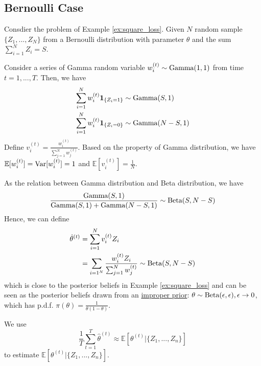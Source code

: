 \documentclass[11pt]{elegantbook}
\begin{document}
\subsection{Bernoulli Case}
Consdier the problem of Example \ref{ex:square_loss}. Given $N$ random sample $\{Z_1,...,Z_N\}$ from a Bernoulli distribution with parameter $\theta$ and the sum $\sum_{i=1}^N Z_i=S$.

Consider a series of Gamma random variable $w_i^{(t)}\sim \textnormal{Gamma}(1,1)$ from time $t=1,...,T$. Then, we have
\begin{equation}
    \begin{aligned}
        \sum_{i=1}^N w_i^{(t)} \mathbf{1}_{\{Z_i=1\}}&\sim \textnormal{Gamma}(S,1)\\
        \sum_{i=1}^N w_i^{(t)} \mathbf{1}_{\{Z_i=0\}}&\sim \textnormal{Gamma}(N-S,1)
    \end{aligned}
    \nonumber
\end{equation}
Define $v_i^{(t)}=\frac{w_i^{(t)}}{\sum_{j=1}^N w_j^{(t)}}$. Based on the property of Gamma distribution, we have $\mathbb{E}[w_i^{(t)}]=\textnormal{Var}[w_i^{(t)}]=1$ and $\mathbb{E}[v_i^{(t)}]=\frac{1}{N}$.

As the relation between Gamma distribution and Beta distribution, we have
\begin{equation}
    \begin{aligned}
        \frac{\textnormal{Gamma}(S,1)}{\textnormal{Gamma}(S,1)+\textnormal{Gamma}(N-S,1)}\sim \textnormal{Beta}(S,N-S)
    \end{aligned}
    \nonumber
\end{equation}
Hence, we can define
\begin{equation}
    \begin{aligned}
        \hat{\theta}^{(t)}&=\sum_{i=1}^N v_i^{(t)}Z_i\\
        &=\sum_{i=1^N}\frac{w_i^{(t)}Z_i}{\sum_{j=1}^N w_j^{(t)}}\sim \textnormal{Beta}(S,N-S)
    \end{aligned}
    \nonumber
\end{equation}
which is close to the posterior beliefs in Example \ref{ex:square_loss} and can be seen as the posterior beliefs drawn from an \underline{improper prior}: $\theta\sim \textnormal{Beta}(\epsilon,\epsilon), \epsilon \rightarrow 0$, which has p.d.f. $\pi(\theta)=\frac{1}{\theta(1-\theta)}$.

We use $$\frac{1}{T}\sum_{t=1}^T\hat{\theta}^{(t)}\approx \mathbb{E}[\theta^{(t)}|\{Z_1,...,Z_n\}]$$ to estimate $\mathbb{E}[\theta^{(t)}|\{Z_1,...,Z_n\}]$.
\end{document}
